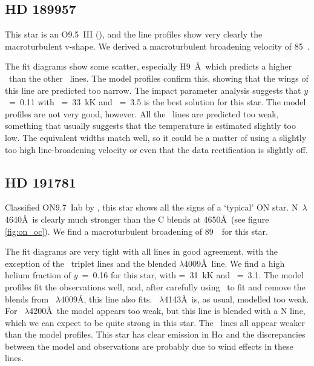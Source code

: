 \subsection{HD 189957}  %
\label{analysis:hd189957}
This star is an O9.5~III (\cite{wa:73}), and the line profiles show
very clearly the macroturbulent v-shape. We derived a
macroturbulent broadening velocity of 85~\kms.

The fit diagrams show some scatter, especially H9~\AA\
which predicts a higher \logg\ than the other \hi\ lines. The model profiles
confirm this, showing that the wings of this line are predicted too
narrow. The impact parameter analysis suggests that $y$~=~0.11 with
\teff~=~33~kK and \logg~=~3.5 is the best solution for this star. The
model profiles are not very good, however. All the \heii\ lines are
predicted too weak, something that usually suggests that the
temperature is estimated slightly too low. The equivalent widths match
well, so it could be a matter of using a slightly too high
line-broadening velocity or even that the data rectification is
slightly off.


\subsection{HD 191781}  %
\label{analysis:hd191781}
Classified ON9.7~Iab by , this star shows all the signs
of a `typical' ON star. N\scr{3}~$\lambda$4640\AA\ is clearly much
stronger than the C blends at 4650\AA\ (see figure \ref{fig:on_oc}). We
find a macroturbulent broadening of 89~\kms\ for this star.

The fit diagrams are very tight with all lines in good agreement, with
the exception of the \hei\ triplet lines and the blended
$\lambda$4009\AA\ line. We find a high helium fraction of $y$~=~0.16
for this star, with \teff=~31~kK and \logg~=~3.1. The model profiles
fit the observations well, and, after carefully using \elf\ to fit and
remove the blends from \hei~$\lambda$4009\AA, this line also
fits. \hei~$\lambda$4143\AA\ is, as usual, modelled too weak. For
\heii~$\lambda$4200\AA\ the model appears too weak, but this line is
blended with a N\scr{3} line, which we can expect to be quite strong
in this star. The \hi\ lines all appear weaker than the model
profiles. This star has clear emission in H$\alpha$ and the
discrepancies between the model and observations are probably due to
wind effects in these lines.

